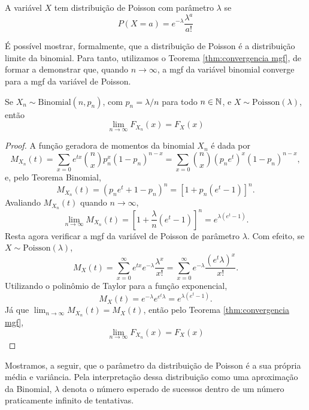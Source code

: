 \begin{def:poisson}
A variável $X$ tem distribuição de Poisson com parâmetro $\lambda$ se
\[
	P(X = a) = e^{-\lambda} \frac{\lambda^a}{a!}
\]
\end{def:poisson}

É possível mostrar, formalmente, que a distribuição de Poisson é a distribuição limite
da binomial.
Para tanto, utilizamos o Teorema \ref{thm:convergencia mgf}, de formar a demonstrar que,
quando $n \to \infty$, a mgf da variável binomial converge para a mgf da variável de Poisson.

\begin{prop:aproximacao poisson da binomial}
Se $X_n \sim \mathrm{Binomial}(n, p_n)$, com $p_n = \lambda / n$ para todo $n \in \mathbb{N}$,
e $X \sim \mathrm{Poisson}(\lambda)$, então
\[
    \lim_{n \to \infty} F_{X_n}(x) = F_X(x)
\]
\end{prop:aproximacao poisson da binomial}
\begin{proof}
A função geradora de momentos da binomial $X_n$ é dada por
\[
    M_{X_n}(t) = \sum_{x=0} e^{tx} \binom n x p_n^x (1-p_n)^{n-x} =
    \sum_{x=0} \binom n x (p_ne^t)^x (1-p_n)^{n-x},
\]
e, pelo Teorema Binomial,
\[
    M_{X_n}(t) = (p_ne^t + 1 - p_n)^n = [1 + p_n (e^t - 1)]^n.
\]
Avaliando $M_{X_n}(t)$ quando $n \to \infty$,
\[
    \lim_{n \to \infty} M_{X_n}(t) =
    \left[1 + \frac \lambda n (e^t - 1)\right]^n =
    e^{\lambda(e^t-1)}.
\]
Resta agora verificar a mgf da variável de Poisson de parâmetro $\lambda$.
Com efeito, se $X \sim \mathrm{Poisson}(\lambda)$,
\[
    M_X(t) =
    \sum_{x=0}^\infty e^{tx} e^{-\lambda} \frac{\lambda^x}{x!} =
    \sum_{x=0}^\infty e^{-\lambda} \frac{(e^t\lambda)^x}{x!}.
\]
Utilizando o polinômio de Taylor para a função exponencial,
\[
    M_X(t) =
    e^{-\lambda} e^{e^t\lambda} =
    e^{\lambda(e^t - 1)}.
\]
Já que $\lim_{n \to \infty} M_{X_n}(t) = M_X(t)$, então pelo Teorema
\ref{thm:convergencia mgf},
\[
    \lim_{n \to \infty} F_{X_n}(x) = F_X(x)
\]
\end{proof}

Mostramos, a seguir, que o parâmetro da distribuição de Poisson é a sua própria média
e variância.
Pela interpretação dessa distribuição como uma aproximação da Binomial, $\lambda$ denota
o número esperado de sucessos dentro de um número praticamente infinito de tentativas.

